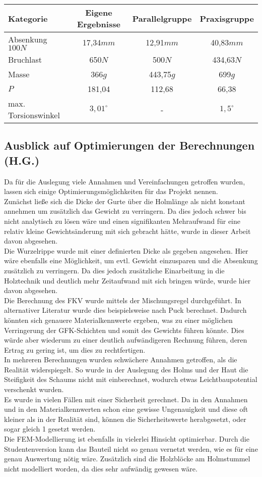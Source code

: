 \begin{center}
\begin{tabular}[h]{l|c|c|c}
Kategorie&Eigene Ergebnisse&Parallelgruppe&Praxisgruppe\\
\hline
Absenkung $100N$&17,34$mm$&12,91$mm$&40,83$mm$\\
Bruchlast&650$N$&500$N$&434,63$N$\\
Masse&366$g$&443,75$g$&699$g$\\
$P$&181,04&112,68&66,38\\
max. Torsionswinkel&$3,01^{\circ}$& - &$1,5^{\circ}$
\end{tabular}
\end{center}


\subsection{Ausblick auf Optimierungen der Berechnungen (H.G.)}
Da für die Auslegung viele Annahmen und Vereinfachungen getroffen wurden, lassen sich einige Optimierungsmöglichkeiten für das Projekt nennen.\\
\noindent
Zunächst ließe sich die Dicke der Gurte über die Holmlänge als nicht konstant annehmen um zusätzlich das Gewicht zu verringern. Da dies jedoch schwer bis nicht analytisch zu lösen wäre und einen signifikanten Mehraufwand für eine relativ kleine Gewichtsänderung mit sich gebracht hätte, wurde in dieser Arbeit davon abgesehen.\\
\noindent
Die Wurzelrippe wurde mit einer definierten Dicke als gegeben angesehen. Hier wäre ebenfalls eine Möglichkeit, um evtl. Gewicht einzusparen und die Absenkung zusätzlich zu verringern. Da dies jedoch zusätzliche Einarbeitung in die Holztechnik und deutlich mehr Zeitaufwand mit sich bringen würde, wurde hier davon abgesehen.\\
\noindent
Die Berechnung des FKV wurde mittels der Mischungsregel durchgeführt. In alternativer Literatur wurde dies beispielsweise nach Puck berechnet. Dadurch könnten sich genauere Materialkennwerte ergeben, was zu einer möglichen Verringerung der GFK-Schichten und somit des Gewichts führen könnte. Dies würde aber wiederum zu einer deutlich aufwändigeren Rechnung führen, deren Ertrag zu gering ist, um dies zu rechtfertigen.\\
\noindent
In mehreren Berechnungen wurden schwächere Annahmen getroffen, als die Realität widerspiegelt. So wurde in der Auslegung des Holms und der Haut die Steifigkeit des Schaums nicht mit einberechnet, wodurch etwas Leichtbaupotential verschenkt wurden.\\
\noindent
Es wurde in vielen Fällen mit einer Sicherheit gerechnet. Da in den Annahmen und in den Materialkennwerten schon eine gewisse Ungenauigkeit und diese oft kleiner als in der Realität sind, können die Sicherheitswerte herabgesetzt, oder sogar gleich 1 gesetzt werden.\\
\noindent
Die FEM-Modellierung ist ebenfalls in vielerlei Hinsicht optimierbar. Durch die Studentenversion kann das Bauteil nicht so genau vernetzt werden, wie es für eine genau Auswertung nötig wäre. Zusätzlich sind die Holzblöcke am Holmstummel nicht modelliert worden, da dies sehr aufwändig gewesen wäre.